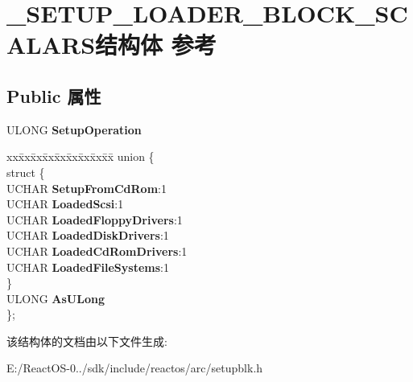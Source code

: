 \hypertarget{struct___s_e_t_u_p___l_o_a_d_e_r___b_l_o_c_k___s_c_a_l_a_r_s}{}\section{\+\_\+\+S\+E\+T\+U\+P\+\_\+\+L\+O\+A\+D\+E\+R\+\_\+\+B\+L\+O\+C\+K\+\_\+\+S\+C\+A\+L\+A\+R\+S结构体 参考}
\label{struct___s_e_t_u_p___l_o_a_d_e_r___b_l_o_c_k___s_c_a_l_a_r_s}
\subsection*{Public 属性}
\begin{DoxyCompactItemize}
\item 
\mbox{\label{struct___s_e_t_u_p___l_o_a_d_e_r___b_l_o_c_k___s_c_a_l_a_r_s_a9c005403713a1f4ff7edf124b0c1c594}} 
U\+L\+O\+NG {\bfseries Setup\+Operation}
\item 
\mbox{\label{struct___s_e_t_u_p___l_o_a_d_e_r___b_l_o_c_k___s_c_a_l_a_r_s_a0ca7beb5e9e7c7cbd02e8762960294fe}} 
\begin{tabbing}
xx\=xx\=xx\=xx\=xx\=xx\=xx\=xx\=xx\=\kill
union \{\\
\mbox{\label{union___s_e_t_u_p___l_o_a_d_e_r___b_l_o_c_k___s_c_a_l_a_r_s_1_1_0D2920_aef782e7f3887b9fc6c82f232b28b34a6}} 
\>struct \{\\
\>\>UCHAR {\bfseries SetupFromCdRom}:1\\
\>\>UCHAR {\bfseries LoadedScsi}:1\\
\>\>UCHAR {\bfseries LoadedFloppyDrivers}:1\\
\>\>UCHAR {\bfseries LoadedDiskDrivers}:1\\
\>\>UCHAR {\bfseries LoadedCdRomDrivers}:1\\
\>\>UCHAR {\bfseries LoadedFileSystems}:1\\
\>\} \\
\>ULONG {\bfseries AsULong}\\
\}; \\

\end{tabbing}\end{DoxyCompactItemize}


该结构体的文档由以下文件生成\+:\begin{DoxyCompactItemize}
\item 
E\+:/\+React\+O\+S-\/0../sdk/include/reactos/arc/setupblk.\+h\end{DoxyCompactItemize}
